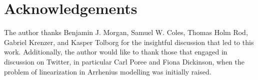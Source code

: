 \documentclass[journal=jceda8,manuscript=article]{achemso}
\begin{document}
\section*{Acknowledgements}

The author thanks Benjamin J. Morgan, Samuel W. Coles, Thomas Holm Rod, Gabriel Krenzer, and Kasper Tolborg for the insightful discussion that led to this work. 
Additionally, the author would like to thank those that engaged in discussion on Twitter, in particular Carl Poree and Fiona Dickinson, when the problem of linearization in Arrhenius modelling was initially raised. 


\end{document}
